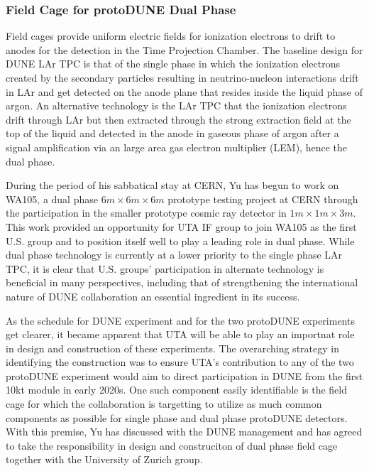\subsubsection{Field Cage for protoDUNE Dual Phase}
Field cages provide uniform electric fields for ionization electrons to drift to anodes for the detection in the Time Projection Chamber.
The baseline design for DUNE LAr TPC is that of the single phase in which the ionization electrons created by the secondary particles 
resulting in neutrino-nucleon interactions drift in LAr and get detected on the anode plane that resides inside the liquid phase of argon.  An alternative technology is the LAr TPC that the ionization electrons drift through LAr but then extracted through the strong extraction field at the top of the liquid and detected in the anode in gaseous phase of argon after a signal amplification via an large area gas electron multiplier (LEM), hence the dual phase.

During the period of his sabbatical stay at CERN, Yu has begun to work on WA105, a dual phase $6m\times 6m\times 6m$ prototype testing project at CERN through the participation in the smaller prototype cosmic ray detector in $1m\times 1m\times 3m$.  This work provided an opportunity for UTA IF group to join WA105 as the first U.S. group and to position itself well to play a leading role in dual phase.   While dual phase technology is currently at a lower priority to the single phase LAr TPC, it is clear that U.S. groups' participation in alternate technology is beneficial in many perspectives, including that of strengthening the international nature of DUNE collaboration an essential ingredient in its success.

As the schedule for DUNE experiment and for the two protoDUNE experiments get clearer, it became apparent that UTA will be able to play an importnat role in design and construction of these experiments.   The overarching strategy in identifying the construction was to ensure UTA's contribution to any of the two protoDUNE experiment would aim to direct participation in DUNE from the first 10kt module in early 2020s.  One such component easily identifiable is the field cage for which the collaboration is targetting to utilize as much common components as possible for single phase and dual phase protoDUNE detectors.    With this premise, Yu has discussed with the DUNE management and has agreed to take the responsibility in design and construciton of dual phase field cage together with the University of Zurich group.     
